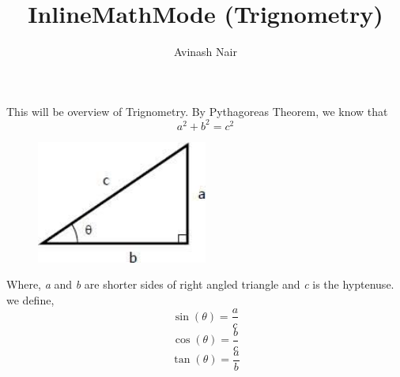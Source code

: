 \documentclass[12pt , letterpaper]{article}
\title{InlineMathMode (Trignometry)}
\author{Avinash Nair}
\begin{document}
\maketitle
This will be overview of Trignometry.
\newline By Pythagoreas Theorem, we know that
$$a^2 + b^2 =c^2$$
\begin{figure}[h]
    \centering
    \includegraphics[width=0.50\textwidth]{fig1}
\end{figure}
Where, \emph{a} and \emph{b} are shorter sides of right angled triangle
and \emph{c} is the hyptenuse.
we define,
\begin{equation}
    \sin(\theta) = \frac{a}{c}
\end{equation}
\begin{equation}
    \cos(\theta) = \frac{b}{c}
\end{equation}
\begin{equation}
      \tan(\theta) = \frac{a}{b}
\end{equation}
\end{document}
